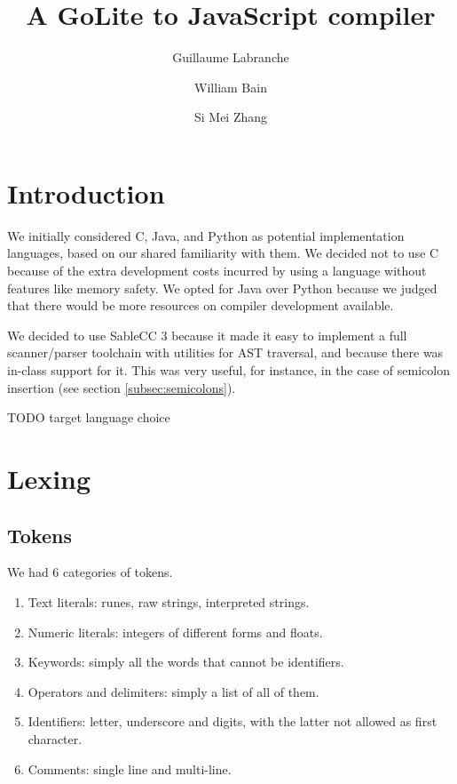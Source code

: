 \documentclass[oneside]{article}
\begin{document}
\title{A GoLite to JavaScript compiler}
\author{Guillaume Labranche \and William Bain \and Si Mei Zhang}
\maketitle

\tableofcontents

\section{Introduction}

We initially considered C, Java, and Python as potential implementation languages, based on our shared familiarity with them. We decided not to use C because of the extra development costs incurred by using a language without features like memory safety. We opted for Java over Python because we judged that there would be more resources on compiler development available.

We decided to use SableCC 3 because it made it easy to implement a full scanner/parser toolchain with utilities for AST traversal, and because there was in-class support for it. This was very useful, for instance, in the case of semicolon insertion (see section \ref{subsec:semicolons}).

TODO target language choice

\section{Lexing}

\subsection{Tokens}
We had 6 categories of tokens.
\begin{enumerate}
\item Text literals: runes, raw strings, interpreted strings.
\item Numeric literals: integers of different forms and floats.
\item Keywords: simply all the words that cannot be identifiers.
\item Operators and delimiters: simply a list of all of them.
\item Identifiers: letter, underscore and digits, with the latter not allowed as first character.
\item Comments: single line and multi-line.
\end{enumerate}
\end{document}
